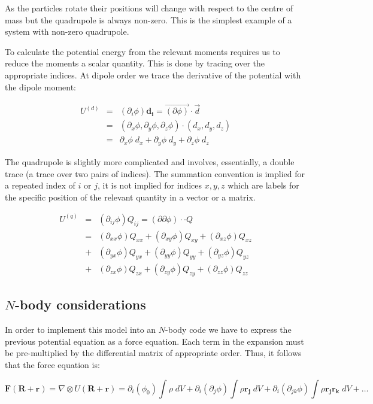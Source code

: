 \noindent As the particles rotate their positions will change with respect to the centre of mass but the quadrupole is always non-zero. This is the simplest example of a system with non-zero quadrupole.

To calculate the potential energy from the relevant moments requires us to reduce the moments a scalar quantity. This is done by tracing over the appropriate indices. At dipole order we trace the derivative of the potential with the dipole moment:

\begin{eqnarray}
U^{(d)} &=& (\partial_i \phi) \mathbf{d_i} = \vec{(\partial \phi)}\cdot\vec{d} \\
&=& (\partial_x \phi, \partial_y \phi, \partial_z \phi)\cdot(d_x, d_y, d_z) \\
&=& \partial_x \phi \; d_x + \partial_y \phi\; d_y + \partial_z \phi\; d_z
\end{eqnarray}

\noindent The quadrupole is slightly more complicated and involves, essentially, a double trace (a trace over two pairs of indices). The summation convention is implied for a repeated index of $i$ or $j$, it is not implied for indices $x, y, z$ which are labels for the specific position of the relevant quantity in a vector or a matrix.

\begin{eqnarray}
U^{(q)} &=& (\partial_{ij} \phi) Q_{ij} = (\partial\partial \phi)\cdot\cdot Q \\
&=& (\partial_{xx} \phi) Q_{xx} + (\partial_{xy} \phi) Q_{xy} + (\partial_{xz} \phi) Q_{xz} \\
&+& (\partial_{yx} \phi) Q_{yx} + (\partial_{yy} \phi) Q_{yy} + (\partial_{yz} \phi) Q_{yz} \\
&+& (\partial_{zx} \phi) Q_{zx} + (\partial_{zy} \phi) Q_{zy} + (\partial_{zz} \phi) Q_{zz}
\end{eqnarray}

\subsection{$N$-body considerations}
In order to implement this model into an $N$-body code we have to express the previous potential equation as a force equation. Each term in the expansion must be pre-multiplied by the differential matrix of appropriate order. Thus, it follows that the force equation is:

\begin{equation}
\mathbf{F} (\mathbf{R} +\mathbf{r}) = \nabla \otimes U (\mathbf{R }+ \mathbf{r}) = \partial_i(\phi_0) \int \rho\;dV + \partial_i(\partial_j \phi) \int \rho \mathbf{r_j}\;dV + \partial_i(\partial_{jk} \phi) \int \rho \mathbf{r_j} \mathbf{r_k}\;dV + \ldots
\end{equation}

